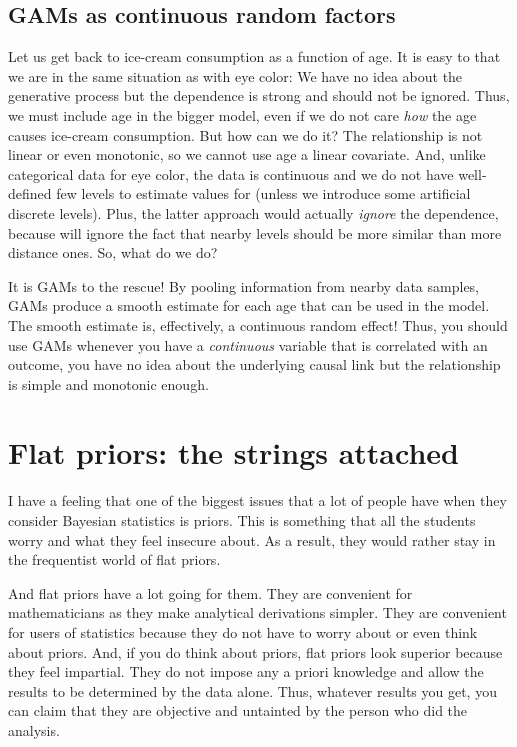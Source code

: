 \documentclass[
]{book}
\begin{document}
\hypertarget{gams-as-continuous-random-factors}{%
\section{GAMs as continuous random factors}\label{gams-as-continuous-random-factors}}

Let us get back to ice-cream consumption as a function of age. It is easy to that we are in the same situation as with eye color: We have no idea about the generative process but the dependence is strong and should not be ignored. Thus, we must include age in the bigger model, even if we do not care \emph{how} the age causes ice-cream consumption. But how can we do it? The relationship is not linear or even monotonic, so we cannot use age a linear covariate. And, unlike categorical data for eye color, the data is continuous and we do not have well-defined few levels to estimate values for (unless we introduce some artificial discrete levels). Plus, the latter approach would actually \emph{ignore} the dependence, because will ignore the fact that nearby levels should be more similar than more distance ones. So, what do we do?

It is GAMs to the rescue! By pooling information from nearby data samples, GAMs produce a smooth estimate for each age that can be used in the model. The smooth estimate is, effectively, a continuous random effect! Thus, you should use GAMs whenever you have a \emph{continuous} variable that is correlated with an outcome, you have no idea about the underlying causal link but the relationship is simple and monotonic enough.

\hypertarget{flat-priors-the-strings-attached}{%
\chapter{Flat priors: the strings attached}\label{flat-priors-the-strings-attached}}

I have a feeling that one of the biggest issues that a lot of people have when they consider Bayesian statistics is priors. This is something that all the students worry and what they feel insecure about. As a result, they would rather stay in the frequentist world of flat priors.

And flat priors have a lot going for them. They are convenient for mathematicians as they make analytical derivations simpler. They are convenient for users of statistics because they do not have to worry about or even think about priors. And, if you do think about priors, flat priors look superior because they feel impartial. They do not impose any a priori knowledge and allow the results to be determined by the data alone. Thus, whatever results you get, you can claim that they are objective and untainted by the person who did the analysis.
\end{document}

